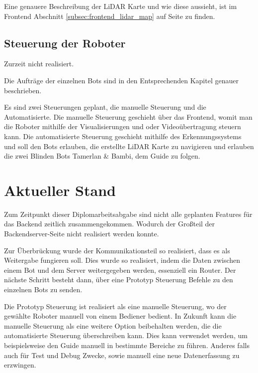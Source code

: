 Eine genauere Beschreibung der LiDAR Karte und wie diese aussieht, 
ist im Frontend Abschnitt \ref{subsec:frontend_lidar_map} 
auf Seite \pageref{subsec:frontend_lidar_map} zu finden.

\subsection{Steuerung der Roboter}
\label{subsec:backend_robot_detection}
Zurzeit nicht realisiert.

Die Aufträge der einzelnen Bots 
sind in den Entsprechenden Kapitel genauer beschrieben.

Es sind zwei Steuerungen geplant, 
die manuelle Steuerung und die Automatisierte.
% 
Die manuelle Steuerung geschieht über das Frontend, 
womit man die Roboter mithilfe der Visualisierungen 
und oder Videoübertragung steuern kann.
% 
Die automatisierte Steuerung geschieht mithilfe des Erkennungssystems 
und soll den Bots erlauben, die erstellte LiDAR Karte zu navigieren 
und erlauben die zwei Blinden Bots Tamerlan \& Bambi, dem Guide zu folgen.

\section{Aktueller Stand}
\label{subsec:backend_aktueller_stand}
Zum Zeitpunkt dieser Diplomarbeitsabgabe 
sind nicht alle geplanten Features für das Backend zeitlich zusammengekommen.
Wodurch der Großteil der Backendserver-Seite nicht realisiert werden konnte.

Zur Überbrückung wurde der Kommunikationsteil so realisiert, 
dass es als Weitergabe fungieren soll.
Dies wurde so realisiert, indem die Daten 
zwischen einem Bot und dem Server weitergegeben werden, essenziell ein Router. 
Der nächste Schritt besteht dann, über eine Prototyp Steuerung 
Befehle zu den einzelnen Bots zu senden.

Die Prototyp Steuerung ist realisiert als eine manuelle Steuerung, 
wo der gewählte Roboter manuell von einem Bediener bedient.
In Zukunft kann die manuelle Steuerung als eine weitere Option beibehalten werden, 
die die automatisierte Steuerung überschreiben kann. 
Dies kann verwendet werden, 
um beispielsweise den Guide manuell in bestimmte Bereiche zu führen.
Anderes falls auch für Test und Debug Zwecke, 
sowie manuell eine neue Datenerfassung zu erzwingen.

